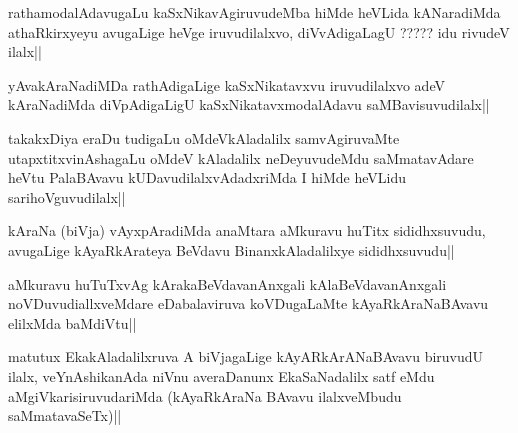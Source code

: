 \begin{artha}
rathamodalAdavugaLu kaSxNikavAgiruvudeMba hiMde heVLida kANaradiMda athaRkirxyeyu avugaLige heVge iruvudilalxvo, diVvAdigaLagU ????? idu rivudeV ilalx||
\end{artha}

\begin{artha}
yAvakAraNadiMDa rathAdigaLige kaSxNikatavxvu iruvudilalxvo adeV kAraNadiMda diVpAdigaLigU kaSxNikatavxmodalAdavu saMBavisuvudilalx||
\end{artha}

\begin{artha}
takakxDiya eraDu tudigaLu oMdeVkAladalilx samvAgiruvaMte utapxtitxvinAshagaLu oMdeV kAladalilx neDeyuvudeMdu saMmatavAdare heVtu PalaBAvavu kUDavudilalxvAdadxriMda I hiMde heVLidu sarihoVguvudilalx||
\end{artha}

\begin{artha}
kAraNa (biVja) vAyxpAradiMda anaMtara aMkuravu huTitx sididhxsuvudu, avugaLige kAyaRkArateya BeVdavu BinanxkAladalilxye sididhxsuvudu||
\end{artha}

\begin{artha}
aMkuravu huTuTxvAg kArakaBeVdavanAnxgali kAlaBeVdavanAnxgali noVDuvudiallxveMdare eDabalaviruva koVDugaLaMte kAyaRkAraNaBAvavu elilxMda baMdiVtu||
\end{artha}

\begin{artha}
matutux EkakAladalilxruva A biVjagaLige kAyARkArANaBAvavu biruvudU ilalx, veYnAshikanAda niVnu averaDanunx EkaSaNadalilx satf eMdu aMgiVkarisiruvudariMda (kAyaRkAraNa BAvavu ilalxveMbudu saMmatavaSeTx)||
\end{artha}


